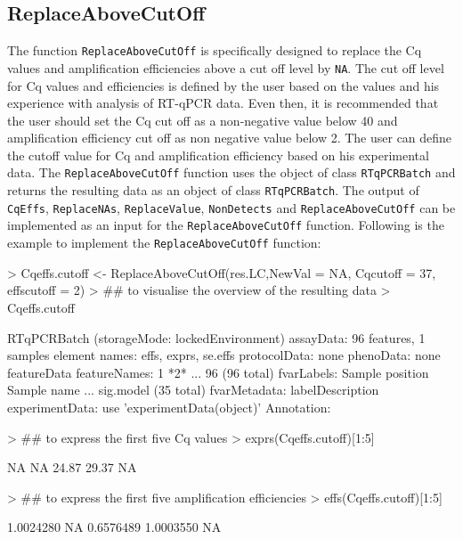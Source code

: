 \documentclass[11pt]{article}
\newcommand{\code}[1]{{\tt #1}}
\begin{document}
\subsection{ReplaceAboveCutOff} 
The function \code{ReplaceAboveCutOff} is specifically designed to replace the Cq values and amplification efficiencies above a cut off level by \code{NA}. The cut off level for Cq values and efficiencies is defined by the user based on the values and his experience with analysis of RT-qPCR data. Even then, it is recommended that the user should set the Cq cut off as a non-negative value below 40 and amplification efficiency cut off as non negative value below 2. The user can define the cutoff value for Cq and amplification efficiency based on his experimental data. The \code{ReplaceAboveCutOff} function uses the object of class \code{RTqPCRBatch} and returns the resulting data as an object of class \code{RTqPCRBatch}. The output of \code{CqEffs}, \code{ReplaceNAs}, \code{ReplaceValue}, \code{NonDetects} and \code{ReplaceAboveCutOff} can be implemented as an input for the \code{ReplaceAboveCutOff} function. Following is the example to implement the \code{ReplaceAboveCutOff} function:

\begin{Schunk}
\begin{Sinput}
> Cqeffs.cutoff <- ReplaceAboveCutOff(res.LC,NewVal = NA, Cqcutoff = 37, effscutoff = 2)
> ## to visualise the overview of the resulting data
> Cqeffs.cutoff 
\end{Sinput}
\begin{Soutput}
RTqPCRBatch (storageMode: lockedEnvironment)
assayData: 96 features, 1 samples 
  element names: effs, exprs, se.effs 
protocolData: none
phenoData: none
featureData
  featureNames: 1 *2* ... 96 (96 total)
  fvarLabels: Sample position Sample name ... sig.model (35 total)
  fvarMetadata: labelDescription
experimentData: use 'experimentData(object)'
Annotation:  
\end{Soutput}
\begin{Sinput}
> ## to express the first five Cq values
> exprs(Cqeffs.cutoff)[1:5]
\end{Sinput}
\begin{Soutput}
[1]    NA    NA 24.87 29.37    NA
\end{Soutput}
\begin{Sinput}
> ## to express the first five amplification efficiencies
> effs(Cqeffs.cutoff)[1:5] 
\end{Sinput}
\begin{Soutput}
[1] 1.0024280        NA 0.6576489 1.0003550        NA
\end{Soutput}
\end{Schunk}
\end{document}
